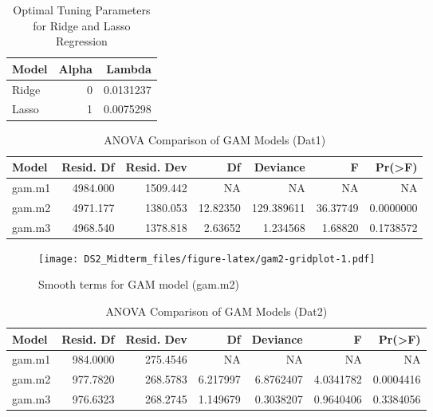 \documentclass[
]{article}
\begin{document}
\begin{table}

\caption{\label{tab:tune-table}Optimal Tuning Parameters for Ridge and Lasso Regression}
\centering
\begin{tabular}[t]{l|r|r}
\hline
Model & Alpha & Lambda\\
\hline
Ridge & 0 & 0.0131237\\
\hline
Lasso & 1 & 0.0075298\\
\hline
\end{tabular}
\end{table}

\begin{table}

\caption{\label{tab:d1-anova-table}ANOVA Comparison of GAM Models (Dat1)}
\centering
\begin{tabular}[t]{l|r|r|r|r|r|r}
\hline
Model & Resid. Df & Resid. Dev & Df & Deviance & F & Pr(>F)\\
\hline
gam.m1 & 4984.000 & 1509.442 & NA & NA & NA & NA\\
\hline
gam.m2 & 4971.177 & 1380.053 & 12.82350 & 129.389611 & 36.37749 & 0.0000000\\
\hline
gam.m3 & 4968.540 & 1378.818 & 2.63652 & 1.234568 & 1.68820 & 0.1738572\\
\hline
\end{tabular}
\end{table}

\begin{figure}
\centering
\texttt{[image: DS2\_Midterm\_files/figure-latex/gam2-gridplot-1.pdf]}
\caption{\label{fig:gam2-gridplot}Smooth terms for GAM model (gam.m2)}
\end{figure}

\begin{table}

\caption{\label{tab:d2-anova-table}ANOVA Comparison of GAM Models (Dat2)}
\centering
\begin{tabular}[t]{l|r|r|r|r|r|r}
\hline
Model & Resid. Df & Resid. Dev & Df & Deviance & F & Pr(>F)\\
\hline
gam.m1 & 984.0000 & 275.4546 & NA & NA & NA & NA\\
\hline
gam.m2 & 977.7820 & 268.5783 & 6.217997 & 6.8762407 & 4.0341782 & 0.0004416\\
\hline
gam.m3 & 976.6323 & 268.2745 & 1.149679 & 0.3038207 & 0.9640406 & 0.3384056\\
\hline
\end{tabular}
\end{table}
\end{document}
